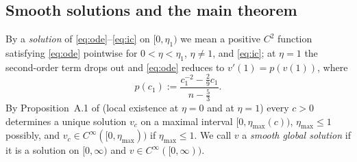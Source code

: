 \documentclass[11pt,a4paper]{amsart}
\theoremstyle{definition}
\theoremstyle{remark}
\begin{document}
\subsection{Smooth solutions and the main theorem}
By a \emph{solution} of \eqref{eq:ode}--\eqref{eq:ic} on $[0,\eta_1)$ we mean a positive $C^2$ function satisfying \eqref{eq:ode} pointwise for $0<\eta<\eta_1$, $\eta\ne1$, and \eqref{eq:ic}; at $\eta=1$ the second-order term drops out and \eqref{eq:ode} reduces to $v'(1)=p(v(1))$, where
\begin{equation}\label{eq:p}
p(c_1):=\frac{c_1^{-2}-\frac29c_1}{\,n-\frac53\,}.
\end{equation}
By Proposition~A.1 of \cite{GHL22} (local existence at $\eta=0$ and at $\eta=1$) every $c>0$ determines a unique solution $v_c$ on a maximal interval $[0,\eta_{\max}(c))$, $\eta_{\max}\le1$ possibly, and $v_c\in C^\infty([0,\eta_{\max}))$ if $\eta_{\max}\le 1$.  We call $v$ a \emph{smooth global solution} if it is a solution on $[0,\infty)$ and $v\in C^\infty([0,\infty))$.
\end{document}
